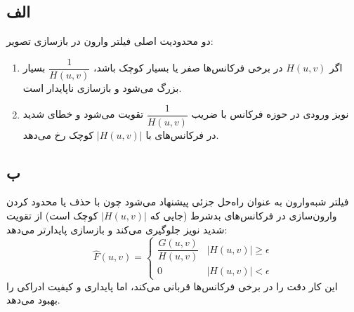\subsection*{الف}
دو محدودیت اصلی فیلتر وارون در بازسازی تصویر:
\begin{enumerate}
\item اگر $H(u,v)$ در برخی فرکانس‌ها صفر یا بسیار کوچک باشد، $\dfrac{1}{H(u,v)}$ بسیار بزرگ می‌شود و بازسازی ناپایدار است.
\item نویز ورودی در حوزه فرکانس با ضریب $\dfrac{1}{H(u,v)}$ تقویت می‌شود و خطای شدید در فرکانس‌های با $|H(u,v)|$ کوچک رخ می‌دهد.
\end{enumerate}

\subsection*{ب}
فیلتر شبه‌وارون به عنوان راه‌حل جزئی پیشنهاد می‌شود چون با حذف یا محدود کردن وارون‌سازی در فرکانس‌های بدشرط (جایی که $|H(u,v)|$ کوچک است) از تقویت شدید نویز جلوگیری می‌کند و بازسازی پایدارتر می‌دهد:
\[
\hat{F}(u,v)=
\begin{cases}
\dfrac{G(u,v)}{H(u,v)} & |H(u,v)|\ge \epsilon\\
0 & |H(u,v)|<\epsilon
\end{cases}
\]
این کار دقت را در برخی فرکانس‌ها قربانی می‌کند، اما پایداری و کیفیت ادراکی را بهبود می‌دهد.